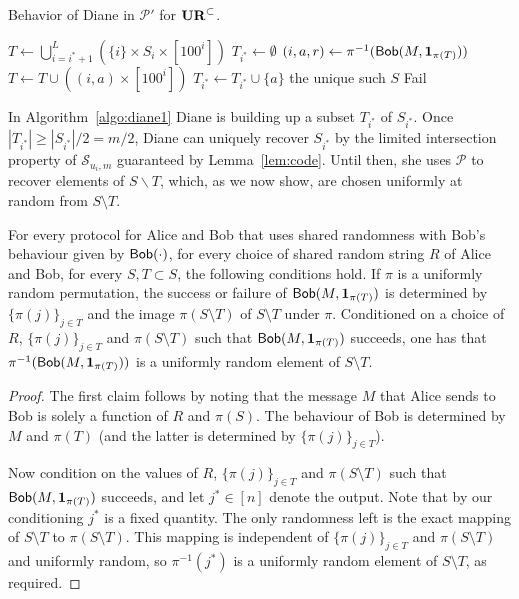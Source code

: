 \begin{algorithm}[H] 
  \caption{Behavior of Diane in $\mathcal P'$ for $\mathbf{UR}^\subset$.} \label{algo:diane1}
  \begin{algorithmic}[1]
    \State $T \leftarrow \bigcup_{i=i^*+1}^L (\{i\} \times S_i \times [100^i])$
    \State $T_{i^*}\leftarrow \emptyset$
      \State $(i,a,r)\leftarrow \pi^{-1}(\mathsf{Bob}(M, \mathbf{1}_{\pi(T)}))$
      \State $T\leftarrow T \cup ((i,a) \times [100^i])$
        \State $T_{i^*} \leftarrow T_{i^*}\cup \{a\}$
      \EndIf
    \EndWhile
      \State \Return the unique such $S$
    \Else
      \State \Return \textsf{Fail}
    \EndIf
    \EndProcedure
  \end{algorithmic}
\end{algorithm}

In Algorithm~\ref{algo:diane1} Diane is building up a subset $T_{i^*}$ of $S_{i^*}$. Once $|T_{i^*}| \ge |S_{i^*}|/2 = m/2$, Diane can uniquely recover $S_{i^*}$ by the limited intersection property of $\mathcal{S}_{u_i,m}$ guaranteed by Lemma~\ref{lem:code}. Until then, she uses $\mathcal P$ to recover elements of $S\backslash T$, which, as we now show, are chosen uniformly at random from $S\setminus T$. 

\begin{claim}\label{cl:uniform}
For every protocol for Alice and Bob that uses shared randomness with Bob's behaviour given by $\mathsf{Bob}(\cdot)$, for every choice of shared random string $R$ of Alice and Bob, for every $S, T\subset S$, the following conditions hold. If $\pi$ is a uniformly random permutation, the success or failure of $\mathsf{Bob}(M, \mathbf{1}_{\pi(T)})$ is determined by $\{\pi(j)\}_{j\in T}$ and the image $\pi(S\setminus T)$ of $S\setminus T$ under $\pi$. Conditioned on a choice of $R$, $\{\pi(j)\}_{j\in T}$ and $\pi(S\setminus T)$ such that $\mathsf{Bob}(M, \mathbf{1}_{\pi(T)})$ succeeds, one has that $\pi^{-1}(\mathsf{Bob}(M, \mathbf{1}_{\pi(T)}))$ is a uniformly random element of $S\setminus T$.
\end{claim}
\begin{proof}
The first claim follows by noting that the message $M$ that Alice sends to Bob is solely a function of $R$ and $\pi(S)$. The behaviour of Bob is determined by $M$ and $\pi(T)$ (and the latter is determined by $\{\pi(j)\}_{j\in T}$).

Now condition on the values of $R$, $\{\pi(j)\}_{j\in T}$ and $\pi(S\setminus T)$ such that  $\mathsf{Bob}(M, \mathbf{1}_{\pi(T)})$ succeeds, and let $j^*\in [n]$ denote the output. Note that by our conditioning $j^*$ is a fixed quantity. The only randomness left is the exact mapping of $S\setminus T$ to $\pi(S\setminus T)$. This mapping is independent of $\{\pi(j)\}_{j\in T}$ and $\pi(S\setminus T)$ and uniformly random, so $\pi^{-1}(j^*)$ is a uniformly random element of $S\setminus T$, as required.
\end{proof}

